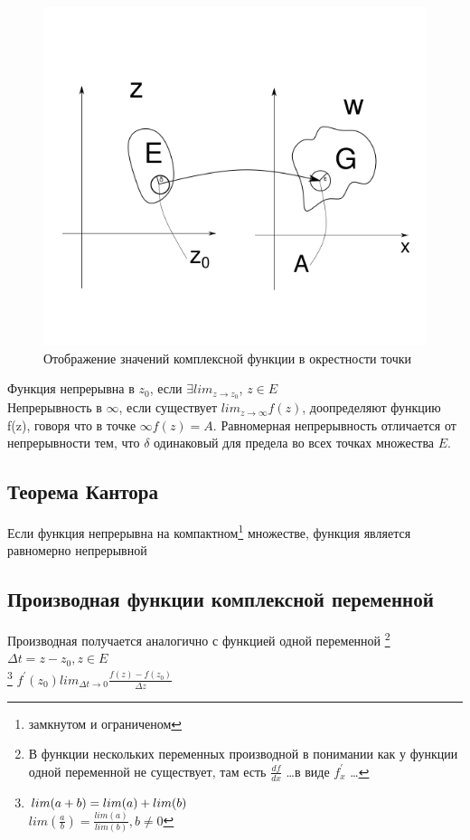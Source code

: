 \documentclass{article}
\begin{document}
            \begin{figure}[H]
                  \includegraphics[width=0.6\linewidth]{complex_imagine_example2}
                  \caption{Отображение значений комплексной функции в окрестности точки}
                  \label{ris:complex_imagine_example2}
            \end{figure}
            Функция непрерывна в $z_{0}$, если $\exists lim_{z \rightarrow z_{0}}$, $z \in E$\\
            Непрерывность в $\infty$, если существует $lim_{z \rightarrow \infty} f(z)$, доопределяют функцию f(z), говоря что в точке $\infty f(z)=A$. Равномерная непрерывность отличается от непрерывности тем, что $\delta$ одинаковый для предела во всех точках множества $E$.
            \newpage
            \subsection{Теорема Кантора}
            Если функция непрерывна на компактном\footnote{замкнутом и ограниченом} множестве, функция является равномерно непрерывной
            \bigskip
            \subsection{Производная функции комплексной переменной}
            Производная получается аналогично с функцией одной переменной \footnote{В функции нескольких переменных производной в понимании как у функции одной переменной не существует, там есть $\frac{df}{dx}$ \ldots в виде $f^{\prime}_{x}$ \ldots}
            $\Delta t = z - z_{0}, z \in E $ \\
            \let\thefootnote\relax\footnote{$ \\ lim(a+b) = lim(a)+lim(b)$ \\ $lim(\frac{a}{b})=\frac{lim(a)}{lim(b)},b \neq 0$}
            $f^{\prime}(z_{0}) lim_{\Delta t\rightarrow 0} \frac{f(z)-f(z_{0})}{\Delta z}$ 
            \bigskip
\end{document}
